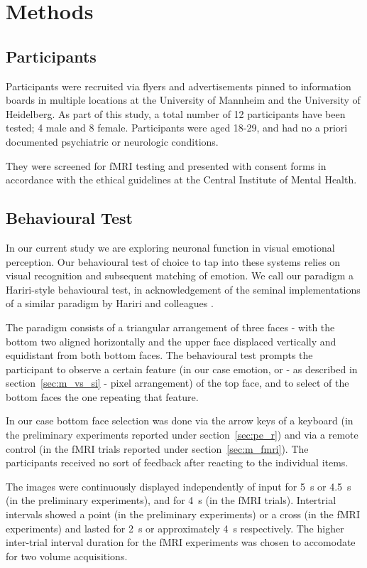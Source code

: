 \chapter{Methods}\label{sec:m}
    \section{Participants}\label{sec:m_p}
	Participants were recruited via flyers and advertisements pinned to information boards in multiple locations at the University of Mannheim and the University of Heidelberg.
	As part of this study, a total number of 12 participants have been tested; 4 male and 8 female.
	Participants were aged 18-29, and had no a priori documented psychiatric or neurologic conditions.
	
	They were screened for fMRI testing and presented with consent forms in accordance with the ethical guidelines at the Central Institute of Mental Health. 
    \section{Behavioural Test}\label{sec:m_bt}
	In our current study we are exploring neuronal function in visual emotional perception.
	Our behavioural test of choice to tap into these systems relies on visual recognition and subsequent matching of emotion.
	We call our paradigm a Hariri-style behavioural test, in acknowledgement of the seminal implementations of a similar paradigm by Hariri and colleagues \citep{Hariri2000,Hariri2003}.
	    
	The paradigm consists of a triangular arrangement of three faces - with the bottom two aligned horizontally and the upper face displaced vertically and equidistant from both bottom faces.
	The behavioural test prompts the participant to observe a certain feature (in our case emotion, or - as described in section~\ref{sec:m_vs_si} - pixel arrangement) of the top face, and to select of the bottom faces the one repeating that feature.
	
	In our case bottom face selection was done via the arrow keys of a keyboard (in the preliminary experiments reported under section~\ref{sec:pe_r}) and via a remote control (in the fMRI trials reported under section~\ref{sec:m_fmri}).
	The participants received no sort of feedback after reacting to the individual items.
	
	The images were continuously displayed independently of input for \SI{5}{\second} or \SI{4.5}{\second} (in the preliminary experiments), and for \SI{4}{\second} (in the fMRI trials).
	Intertrial intervals showed a point (in the preliminary experiments) or a cross (in the fMRI experiments) and lasted for \SI{2}{\second} or approximately \SI{4}{\second} respectively.
	The higher inter-trial interval duration for the fMRI experiments was chosen to accomodate for two volume acquisitions.
	
